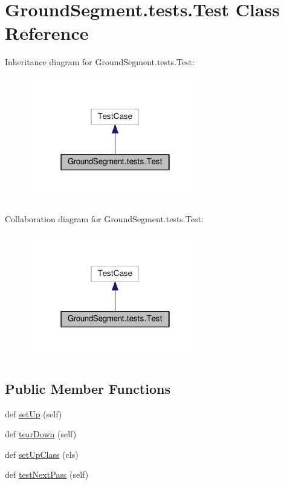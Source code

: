 \hypertarget{class_ground_segment_1_1tests_1_1_test}{}\section{Ground\+Segment.\+tests.\+Test Class Reference}
\label{class_ground_segment_1_1tests_1_1_test}


Inheritance diagram for Ground\+Segment.\+tests.\+Test\+:\nopagebreak
\begin{figure}[H]
\begin{center}
\leavevmode
\includegraphics[width=214pt]{class_ground_segment_1_1tests_1_1_test__inherit__graph}
\end{center}
\end{figure}


Collaboration diagram for Ground\+Segment.\+tests.\+Test\+:\nopagebreak
\begin{figure}[H]
\begin{center}
\leavevmode
\includegraphics[width=214pt]{class_ground_segment_1_1tests_1_1_test__coll__graph}
\end{center}
\end{figure}
\subsection*{Public Member Functions}
\begin{DoxyCompactItemize}
\item 
def \hyperlink{class_ground_segment_1_1tests_1_1_test_ad2192ed0cee22fe08d3980d23032502e}{set\+Up} (self)
\item 
def \hyperlink{class_ground_segment_1_1tests_1_1_test_ad677e9b9c39104329499389f0fef9233}{tear\+Down} (self)
\item 
def \hyperlink{class_ground_segment_1_1tests_1_1_test_ada579a287b743c4cdc58dcd30538a804}{set\+Up\+Class} (cls)
\item 
def \hyperlink{class_ground_segment_1_1tests_1_1_test_aafc81ba3cc12c75d5ad32f106ec98ebf}{test\+Next\+Pass} (self)
\end{DoxyCompactItemize}


